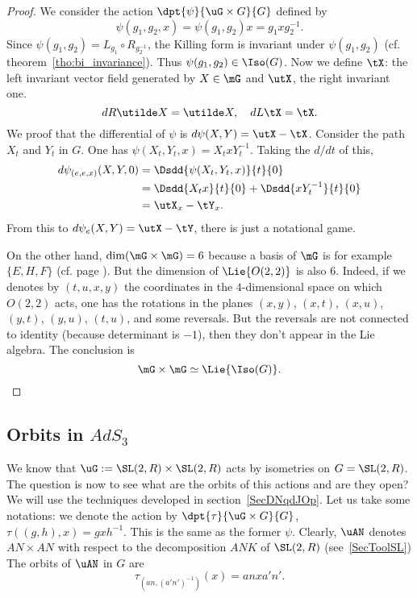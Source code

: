 \begin{proof}

	We consider the action $\dpt{\psi}{\uG\times G}{G}$ defined by
	\[
		\psi(g_1,g_2,x)=\psi(g_1,g_2)x=g_1xg_2^{-1}.
	\]
	Since $\psi(g_1,g_2)=L_{g_1}\circ R_{g_2^{-1}}$, the Killing form is invariant under $\psi(g_1,g_2)$ (cf. theorem~\ref{tho:bi_invariance}). Thus $\psi(g_1,g_2)\in\Iso(G)$. Now we define $\tX$: the left invariant vector field generated by $X\in\mG$ and $\utX$, the right invariant one.
	\[
		dR\utilde X=\utilde X,\quad dL\tX=\tX.
	\]
	We proof that the differential of $\psi$ is $d\psi(X,Y)=\utX-\tX$. Consider the path $X_t$ and $Y_t$ in $G$. One has $\psi(X_t,Y_t,x)=X_txY_t^{-1}$. Taking the $d/dt$ of this,
	\begin{equation}
		\begin{split}
			d\psi_{(e,e,x)}(X,Y,0)&=\Dsdd{\psi(X_t,Y_t,x)}{t}{0}\\
			&=\Dsdd{X_tx}{t}{0}+\Dsdd{xY_t^{-1}}{t}{0}\\
			&=\utX_x-\tY_x.
		\end{split}
	\end{equation}
	From this to $d\psi_e(X,Y)=\utX-\tY$, there is just a notational game.

	On the other hand, $\dim(\mG\times\mG)=6$ because a basis of $\mG$ is for example $\{E,H,F\}$ (cf. page \pageref{SecToolSL}). But the dimension of $\Lie{O(2,2)}$ is also $6$. Indeed, if we denotes by $(t,u,x,y)$ the coordinates in the $4$-dimensional space on which $O(2,2)$ acts, one has the rotations in the planes $(x,y)$, $(x,t)$, $(x,u)$, $(y,t)$, $(y,u)$, $(t,u)$, and some reversals. But the reversals are not connected to identity (because determinant is $-1$), then they don't appear in the Lie algebra.
	The conclusion is
	\[
		\mG\times\mG\simeq\Lie{\Iso(G)}.
	\]

\end{proof}

\subsection{Orbits in \texorpdfstring{$AdS_3$}{AdS3}}

We know that $\uG:=\SL(2,R)\times\SL(2,R)$ acts by isometries on $G=\SL(2,R)$. The question is now to see what are the orbits of this actions and are they open? We will use the techniques developed in section~\ref{SecDNqdJOp}. Let us take some notations: we denote the action by $\dpt{\tau}{\uG\times G}{G}$, $\tau((g,h),x)=gxh^{-1}$. This is the same as the former $\psi$. Clearly, $\uAN$ denotes $AN\times AN$ with respect to the decomposition $ANK$ of $\SL(2,R)$ (see~\ref{SecToolSL}) The orbits of $\uAN$ in $G$ are
\[
	\tau_{ (an,(a'n')^{-1}) }(x)=anxa'n'.
\]


